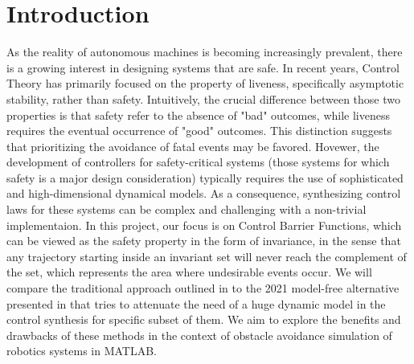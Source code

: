 \section*{Introduction}
As the reality of autonomous machines is becoming increasingly prevalent, there is a growing interest in designing systems that are safe. In recent years, Control Theory has primarily focused on the property of liveness, specifically asymptotic stability, rather than safety.
Intuitively, the crucial difference between those two properties is  that safety refer to the absence of "bad" outcomes, while liveness requires the eventual occurrence of "good" outcomes. This distinction suggests that prioritizing the avoidance of fatal events may be favored.
Hovewer, the development of controllers for safety-critical systems (those systems for which safety is a major design consideration) typically requires the use of sophisticated and high-dimensional dynamical models. As a consequence, synthesizing control laws for these systems can be complex and challenging  with a non-trivial implementaion. 
In this project, our focus is on Control Barrier Functions, which can be viewed as the safety property in the form of invariance, in the sense that any trajectory starting inside an invariant set will never reach the complement of the set, which represents the area where undesirable events occur. 
We will compare the traditional approach outlined in \cite{cbf} to the 2021 model-free alternative presented in \cite{mfcbf} that tries to attenuate the need of a huge dynamic model in the control synthesis for specific subset of them. We aim to explore the benefits and drawbacks of these methods in the context of obstacle avoidance simulation of robotics systems in MATLAB.


